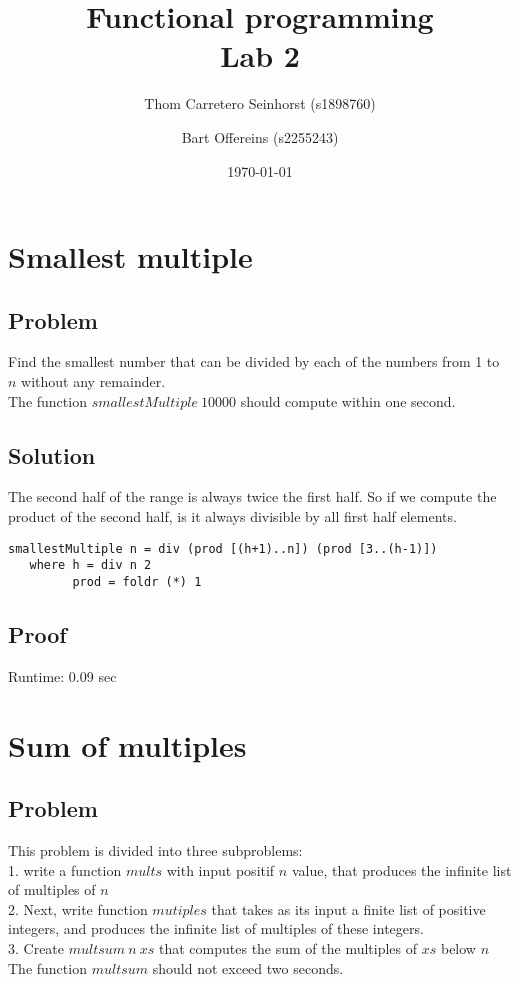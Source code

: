 \documentclass[a4paper,11pt]{article}
\author{Thom Carretero Seinhorst (s1898760) \and Bart Offereins (s2255243)}
\date{\today}
\title{Functional programming \\Lab 2}
\begin{document}
  \maketitle
  
\section{Smallest multiple}
\subsection{Problem}
Find the smallest number that can be divided by each of the numbers from 1 to $n$ without any remainder.\\
The function $smallestMultiple\: 10000$ should compute within one second.

\subsection{Solution}
The second half of the range is always twice the first half. So if we compute the product of the second half, is it always divisible by all first half elements.

\begin{lstlisting}
smallestMultiple n = div (prod [(h+1)..n]) (prod [3..(h-1)])
   where h = div n 2
         prod = foldr (*) 1
\end{lstlisting}
\subsection{Proof}

Runtime: 0.09 sec

\section{Sum of multiples}
\subsection{Problem}
This problem is divided into three subproblems:\\
1. write a function $mults$ with input positif $n$ value, that produces the infinite list of multiples of $n$\\
2. Next, write function $mutiples$ that takes as its input a finite list of positive integers,
and produces the infinite list of multiples of these integers.\\
3. Create $multsum\: n\: xs$ that computes the sum of the multiples
of $xs$ below $n$\\
The function $multsum$ should not exceed two seconds.
\end{document}
